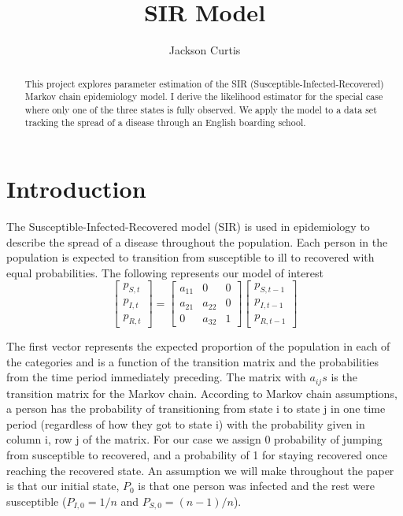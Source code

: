 \documentclass{svproc}
\begin{document}
\mainmatter              
\title{SIR Model}


\author{Jackson Curtis}


\maketitle           

\begin{abstract}
This project explores parameter estimation of the SIR (Susceptible-Infected-Recovered) Markov chain epidemiology model. I derive the likelihood estimator for the special case where only one of the three states is fully observed. We apply the model to a data set tracking the spread of a disease through an English boarding school. 
\end{abstract}

\section{Introduction}
The Susceptible-Infected-Recovered model (SIR) is used in epidemiology to describe the spread of a disease throughout the population. Each person in the population is expected to transition from susceptible to ill to recovered with equal probabilities. The following represents our model of interest
\begin{equation}
\begin{bmatrix}
    p_{S,t}       \\
    p_{I,t}      \\

    p_{R,t}     
\end{bmatrix}
=
\begin{bmatrix}
a_{11} & 0 & 0 \\
a_{21} & a_{22} & 0 \\
0 & a_{32} & 1
\end{bmatrix}
\begin{bmatrix}
    p_{S,t-1}       \\
    p_{I,t-1}      \\

    p_{R,t-1}     
\end{bmatrix}
\end{equation}

The first vector represents the expected proportion of the population in each of the categories and is a function of the transition matrix and the probabilities from the time period immediately preceding. The matrix with $a_{ij}s$ is the transition matrix for the Markov chain. According to Markov chain assumptions, a person has the probability of transitioning from state i to state j in one time period (regardless of how they got to state i) with the probability given in column i, row j of the matrix. For our case we assign 0 probability of jumping from susceptible to recovered, and a probability of 1 for staying recovered once reaching the recovered state. An assumption we will make throughout the paper is that our initial state, $P_0$ is that one person was infected and the rest were susceptible ($P_{I,0}=1/n$ and $P_{S, 0} = (n-1)/n$).
\end{document}
